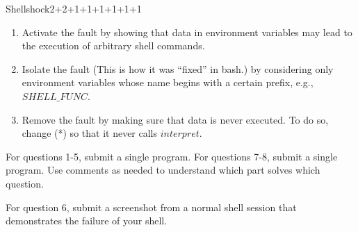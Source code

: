 \documentclass[a4paper]{article}
\begin{document}
\begin{problem}{Shellshock}{2+2+1+1+1+1+1+1}
\begin{enumerate}
\item Activate the fault by showing that data in environment variables may lead to the execution of arbitrary shell commands.

\item Isolate the fault (This is how it was ``fixed'' in bash.) by considering only environment variables whose name begins with a certain prefix, e.g., $SHELL\_FUNC$.

\item Remove the fault by making sure that data is never executed.
To do so, change (*) so that it never calls $interpret$.
\end{enumerate}

For questions 1-5, submit a single program.
For questions 7-8, submit a single program.
Use comments as needed to understand which part solves which question.

For question 6, submit a screenshot from a normal shell session that demonstrates the failure of your shell.
\end{problem}
\end{document}
